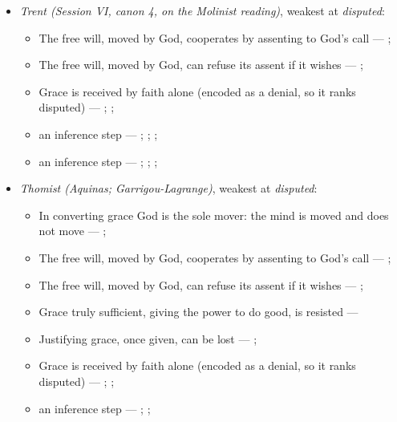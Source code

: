 \documentclass[11pt]{article}
\begin{document}
\begin{itemize}
\begin{itemize}
\end{itemize}
\item \emph{Trent (Session VI, canon 4, on the Molinist reading)}, weakest at \emph{disputed}:
\begin{itemize}
\item The free will, moved by God, cooperates by assenting to God’s call --- \cite[Trent, Session VI (1547), canon 4]{tanner-decrees-1990}; \cite[45]{waterworth-trent-1848}
\item The free will, moved by God, can refuse its assent if it wishes --- \cite[Trent, Session VI (1547), canon 4]{tanner-decrees-1990}; \cite[45]{waterworth-trent-1848}
\item Grace is received by faith alone (encoded as a denial, so it ranks disputed) --- \cite[Augsburg Confession IV.1–3]{concordia-triglotta-1921}; \cite[Sermon 1, III.1]{wesley-sermons-1872}; \cite[Trent, Session VI (1547), canon 9]{tanner-decrees-1990}
\item an inference step --- \cite[I-II q.111 a.2]{aquinas-summa-1920}; \cite[Canons of Dort, III/IV, art. 12]{schaff-creeds-christendom-3-1977}; \cite[Trent, Session VI (1547), canon 4]{tanner-decrees-1990}; \cite[45]{waterworth-trent-1848}
\item an inference step --- \cite[I-II q.10 a.4 ad 3]{aquinas-summa-1920}; \cite[I-II q.112 a.3]{aquinas-summa-1920}; \cite[Trent, Session VI (1547), canon 4]{tanner-decrees-1990}; \cite[45]{waterworth-trent-1848}
\end{itemize}
\item \emph{Thomist (Aquinas; Garrigou-Lagrange)}, weakest at \emph{disputed}:
\begin{itemize}
\item In converting grace God is the sole mover: the mind is moved and does not move --- \cite[I-II q.111 a.2]{aquinas-summa-1920}; \cite[ch. IV]{garrigou-lagrange-grace-1952}
\item The free will, moved by God, cooperates by assenting to God’s call --- \cite[Trent, Session VI (1547), canon 4]{tanner-decrees-1990}; \cite[45]{waterworth-trent-1848}
\item The free will, moved by God, can refuse its assent if it wishes --- \cite[Trent, Session VI (1547), canon 4]{tanner-decrees-1990}; \cite[45]{waterworth-trent-1848}
\item Grace truly sufficient, giving the power to do good, is resisted --- \cite[ch. VI]{garrigou-lagrange-grace-1952}
\item Justifying grace, once given, can be lost --- \cite[II-II q.24 a.11]{aquinas-summa-1920}; \cite[Trent, Session VI (1547), canon 23]{tanner-decrees-1990}
\item Grace is received by faith alone (encoded as a denial, so it ranks disputed) --- \cite[II-II q.4 a.3]{aquinas-summa-1920}; \cite[I-II q.113 a.4 ad 1]{aquinas-summa-1920}; \cite[Trent, Session VI (1547), canon 9]{tanner-decrees-1990}
\item an inference step --- \cite{pohle-molinism-1911}; \cite[I-II q.112 a.3]{aquinas-summa-1920}; \cite[ch. VII]{garrigou-lagrange-grace-1952}
\end{itemize}
\end{itemize}
\end{document}
